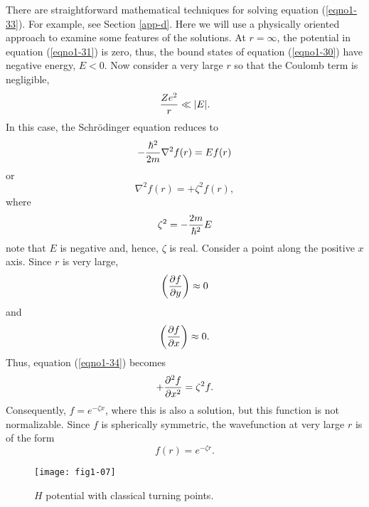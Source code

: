 There are straightforward mathematical techniques for solving equation
(\ref{eqno1-33}).  For example, see Section \ref{app-d}. Here we will
use a physically oriented approach to examine some features of the
solutions.  At $r = \infty$, the potential in equation
(\ref{eqno1-31}) is zero, thus, the bound states of equation
(\ref{eqno1-30}) have negative energy, $E < 0$. Now consider a very
large $r$ so that the Coulomb term is negligible,
\begin{equation}
{Ze^2 \over r} \ll  | E |.
\end{equation}
In this case, the Schr\"odinger equation reduces to
\begin{equation}
- {\hbar^2 \over 2m} \nabla^2 f ( r ) = E f ( r )
\end{equation}
or
\begin{equation}
\nabla^2 f ( r ) = + \zeta^2 f ( r ),
\label{eqno1-34}
\end{equation}
where
\begin{equation}
\zeta^2 = - {2m \over \hbar^2} E
\label{eqno1-35}
\end{equation}
note that $E$ is negative and, hence, $\zeta$ is real. Consider a
point along the positive $x$ axis. Since $r$ is very large,
\begin{equation}
\left( {\partial f \over \partial y} \right) \approx 0
\end{equation}
and
\begin{equation}
\left( {\partial f \over \partial x} \right) \approx 0.
\end{equation}
Thus, equation (\ref{eqno1-34}) becomes
\begin{equation}
+ {\partial^2 f \over \partial x^2} = \zeta^2 f.
\end{equation}
Consequently, $f = e^{-\zeta x}$, where this is also a solution, but this 
function is not normalizable.  Since $f$ is spherically symmetric, the 
wavefunction at very large $r$ is of the form
\begin{equation}
f ( r ) = e^{- \zeta r}.
\label{eqno1-36}
\end{equation}

\begin{figure}
\texttt{[image: fig1-07]}
\caption{$H$ potential with classical turning points.}
\label{fig1-7}
\end{figure}

